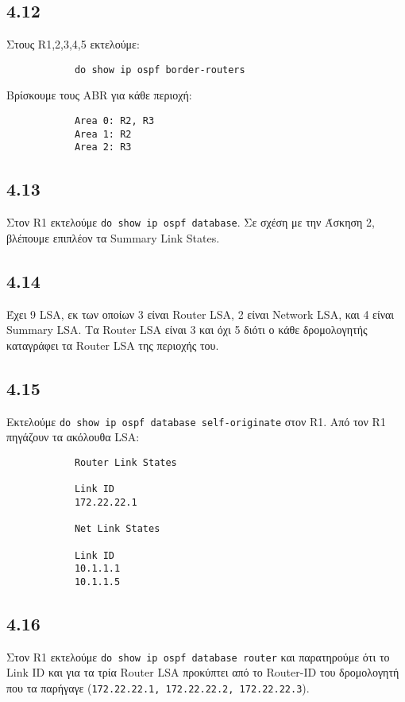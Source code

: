 \documentclass[a4paper, 12pt]{article}
\begin{document}
	\subsection*{4.12}
		Στους R1,2,3,4,5 εκτελούμε: 
		
		\begin{verbatim}
			do show ip ospf border-routers
		\end{verbatim}

		Βρίσκουμε τους ABR για κάθε περιοχή:
		
		\begin{verbatim}
			Area 0: R2, R3
			Area 1: R2
			Area 2: R3
		\end{verbatim}

	\subsection*{4.13}
		Στον R1 εκτελούμε \verb|do show ip ospf database|. Σε σχέση με την Άσκηση 2, βλέπουμε επιπλέον τα Summary Link States.

	\subsection*{4.14}
		Έχει 9 LSA, εκ των οποίων 3 είναι Router LSA, 2 είναι Network LSA, και 4 είναι Summary LSA. Τα Router LSA είναι 3 και όχι 5 διότι ο κάθε δρομολογητής καταγράφει τα Router LSA της περιοχής του.

	\subsection*{4.15}
		Εκτελούμε \verb|do show ip ospf database self-originate| στον R1. Από τον R1 πηγάζουν τα ακόλουθα LSA:
		
		\begin{verbatim}
			Router Link States
			
			Link ID
			172.22.22.1
			
			Net Link States
			
			Link ID
			10.1.1.1
			10.1.1.5
		\end{verbatim}

	\subsection*{4.16}
		Στον R1 εκτελούμε \verb|do show ip ospf database router| και παρατηρούμε ότι το Link ID και για τα τρία Router LSA προκύπτει από το Router-ID του δρομολογητή που τα παρήγαγε (\verb|172.22.22.1, 172.22.22.2, 172.22.22.3|).
\end{document}
